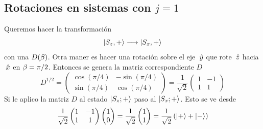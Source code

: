 \documentclass[10pt,oneside]{CBFT_book}
\begin{document}
\subsection{Rotaciones en sistemas con $j=1$}\label{RotacionesJ1}

Queremos hacer la transformación 
\[
	\Ket{S_z,+} \longrightarrow \Ket{S_x,+}
\]
con una $D(\beta)$. Otra maner es hacer una rotación sobre el eje $\:\hat{y}$ que rote $\:\hat{z}$ hacia $\:\hat{x}$
en $\beta=\pi/2$. Entonces se genera la matriz correspondiente $D$
\[
	D^{1/2} = \begin{pmatrix}
	           \cos(\pi/4) & -\sin(\pi/4) \\
	           \sin(\pi/4) & \cos(\pi/4)
	          \end{pmatrix} = \frac{1}{\sqrt{2}}
		\begin{pmatrix}
	           1 & -1 \\
	           1 & 1
	          \end{pmatrix}	          
\]
Si le aplico la matriz $D$ al estado $\Ket{S_z;+}$ paso al $\Ket{S_x;+}$. Esto se ve desde 
\[
	\frac{1}{\sqrt{2}}\begin{pmatrix}
	           1 & -1 \\
	           1 & 1
	          \end{pmatrix}	 
		\begin{pmatrix}
	           1 \\
	           0 
	          \end{pmatrix}	 =
	          \frac{1}{\sqrt{2}}
		\begin{pmatrix}
	           1 \\
	           1 
	          \end{pmatrix}	 =
	           \frac{1}{\sqrt{2}}
	           \left( \Ket{+} + \Ket{-} \right)
\]
\end{document}
